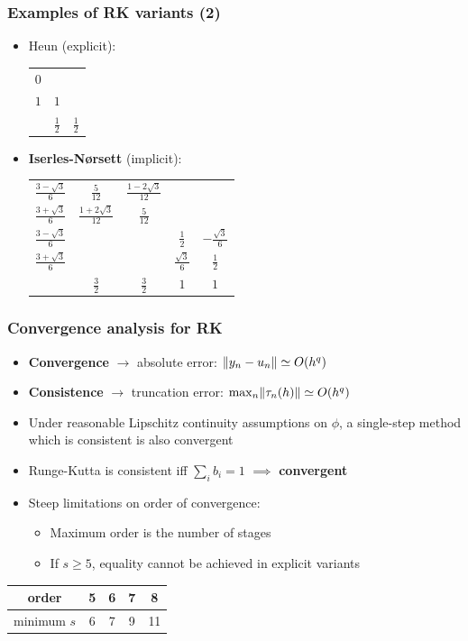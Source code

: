 \documentclass{beamer}
\begin{document}
\begin{frame} %
	\frametitle{Examples of RK variants (2)}
	\begin{itemize}
		\item Heun (explicit):
		\begin{center}
			\begin{tabular}{c|cc}
				$0$ &     & \\
				$1$ & $1$ & \\
				\hline
				& $\frac 1 2$ & $\frac 1 2$
			\end{tabular}
		\end{center}
		\item \textbf{Iserles-Nørsett} (implicit):
		\begin{center}
			\begin{tabular}{c|cccc}
				$\frac{3-\sqrt{3}}{6}$ & $\frac{5}{12}$ & $\frac{1-2\sqrt{3}}{12}$ & & \\
				$\frac{3+\sqrt{3}}{6}$ & $\frac{1+2\sqrt{3}}{12}$ & $\frac{5}{12}$ & & \\
				$\frac{3-\sqrt{3}}{6}$ & & & $\frac{1}{2}$ & $-\frac{\sqrt{3}}{6}$ \\
				$\frac{3+\sqrt{3}}{6}$ & & & $\frac{\sqrt{3}}{6}$ & $\frac{1}{2}$ \\
				\hline
				& $\frac{3}{2}$ & $\frac{3}{2}$ & $1$ & $1$
				\end{tabular}
		\end{center}
	\end{itemize}
\end{frame}


\begin{frame} %
\frametitle{Convergence analysis for RK}
	\begin{itemize}
		\item \textbf{Convergence} $\to$ absolute error: $\lVert y_n - u_n\rVert \simeq O(h^q)$
		\item \textbf{Consistence} $\to$ truncation error: $\max_n \lVert\tau_n(h)\rVert \simeq O(h^q)$
		\item Under reasonable Lipschitz continuity assumptions on $\phi$, a single-step method which is consistent is also convergent
		\pause
		\item Runge-Kutta is consistent iff $\sum_i b_i = 1$ $\implies$ \textbf{convergent}
		\item Steep limitations on order of convergence:
		\begin{itemize}
			\item Maximum order is the number of stages
			\item If $s \ge 5$, equality cannot be achieved in explicit variants \\[10pt]
		\end{itemize}
	\end{itemize}
	\begin{center}
		\begin{tabular}{c|cccc}
			order & 5 & 6 & 7 & 8\\
			\hline
			minimum $s$ & 6 & 7 & 9 & 11 
		\end{tabular}
	\end{center}
\end{frame}
\end{document}
